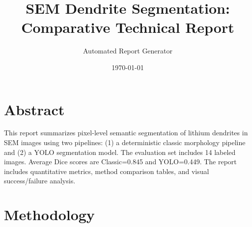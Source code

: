 \documentclass[11pt,a4paper]{article}
\title{SEM Dendrite Segmentation: Comparative Technical Report}
\author{Automated Report Generator}
\date{\today}
\begin{document}
\maketitle

\section*{Abstract}
This report summarizes pixel-level semantic segmentation of lithium dendrites in SEM images using two pipelines:
(1) a deterministic classic morphology pipeline and
(2) a YOLO segmentation model.
The evaluation set includes 14 labeled images.
Average Dice scores are Classic=0.845 and YOLO=0.449.
The report includes quantitative metrics, method comparison tables, and visual success/failure analysis.

\section*{Methodology}
\end{document}
